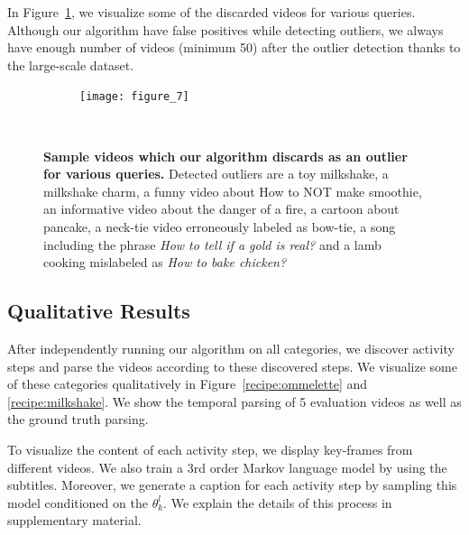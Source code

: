 In Figure~\ref{outliers}, we visualize some of the discarded videos for various queries. Although our algorithm have false positives while detecting outliers, we always have enough number of videos (minimum 50) after the outlier detection thanks to the large-scale dataset.
 
\begin{figure}[ht]
  \begin{subfigure}[b]{0.5\textwidth}
    \texttt{[image: figure\_7]}
  \end{subfigure}~

\caption{\textbf{Sample videos which our algorithm discards as an outlier for various queries.}
Detected outliers are a toy milkshake, a milkshake charm, a funny video about How to NOT make smoothie, an informative video about the danger of a fire, a cartoon about pancake, a neck-tie video erroneously labeled as bow-tie, a song including the phrase \emph{How to tell if a gold is real?} and a lamb cooking mislabeled as \emph{How to bake chicken?}}
\label{outliers}
\end{figure}

\subsection{Qualitative Results}
After independently running our algorithm on all categories, we discover activity steps and parse the videos according to these discovered steps. We visualize some of these categories qualitatively in Figure~\ref{recipe:ommelette} and \ref{recipe:milkshake}. We show the temporal parsing of 5 evaluation videos as well as the ground truth parsing. 

To visualize the content of each activity step, we display key-frames from different videos. We also train a 3rd order Markov language model\cite{languageModel} by using the subtitles. Moreover, we generate a caption for each activity step by sampling this model conditioned on the $\theta^l_k$. We explain the details of this process in supplementary material.

